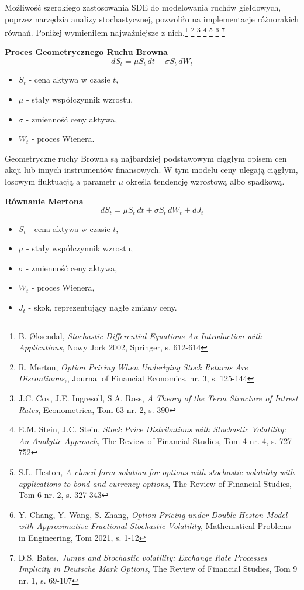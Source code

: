 Możliwość szerokiego zastosowania SDE do modelowania ruchów giełdowych, poprzez narzędzia analizy stochastycznej, pozwoliło na implementacje różnorakich równań. Poniżej wymieniłem najważniejsze z nich.\footnote{B. Øksendal, \textit{Stochastic Differential Equations An Introduction with Applications}, Nowy Jork 2002, Springer, s. 612-614} 
 \footnote{R. Merton, \textit{Option Pricing When Underlying Stock Returns Are Discontinous,}, Journal of Financial Economics, nr. 3, s. 125-144} \footnote{J.C. Cox, J.E. Ingresoll, S.A. Ross, \textit{A Theory of the Term Structure of Intrest Rates}, Econometrica, Tom 63 nr. 2, s. 390} \footnote{E.M. Stein, J.C. Stein, \textit{Stock Price Distributions with Stochastic Volatility: An Analytic Approach}, The Review of Financial Studies, Tom 4 nr. 4, s. 727-752} \footnote{S.L. Heston, \textit{A closed-form solution for options with stochastic volatility with applications to bond and currency options}, The Review of Financial Studies, Tom 6 nr. 2, s. 327-343 } \footnote{Y. Chang, Y. Wang, S. Zhang, \textit{Option Pricing under Double Heston Model with Approximative
Fractional Stochastic Volatility}, Mathematical Problems in Engineering, Tom 2021, s. 1-12} \footnote{D.S. Bates, \textit{Jumps and Stochastic volatility: Exchange Rate Processes Implicity in Deutsche Mark Options}, The Review of Financial Studies, Tom 9 nr. 1, s. 69-107}
    \item \textbf{Proces Geometrycznego Ruchu Browna}
    \begin{equation}
dS_t = \mu S_t \, dt + \sigma S_t \, dW_t
\end{equation}
\begin{itemize}
  \item \( S_t \) - cena aktywa w czasie \( t \),
  \item \( \mu \) - stały współczynnik wzrostu,
  \item \( \sigma \) - zmienność ceny aktywa,
  \item \( W_t \) - proces Wienera.
\end{itemize}
Geometryczne ruchy Browna są najbardziej podstawowym ciągłym opisem cen akcji lub innych instrumentów finansowych. W tym modelu ceny ulegają ciągłym, losowym fluktuacją a parametr \( \mu \) określa tendencję wzrostową albo spadkową. 
    \item \textbf{Równanie Mertona}
    \begin{equation}
dS_t = \mu S_t \, dt + \sigma S_t \, dW_t + dJ_t
\end{equation}
\begin{itemize}
  \item \( S_t \) - cena aktywa w czasie \( t \),
  \item \( \mu \) - stały współczynnik wzrostu,
  \item \( \sigma \) - zmienność ceny aktywa,
  \item \( W_t \) - proces Wienera,
  \item \( J_t \) - skok, reprezentujący nagłe zmiany ceny.
\end{itemize}
